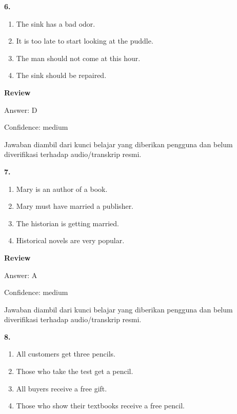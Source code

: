\documentclass[12pt]{article}
\begin{document}
\vspace{0.25\baselineskip}
\noindent\textbf{6.}
\begin{enumerate}[label=(\Alph*),leftmargin=*,itemsep=0.2em]
\item The sink has a bad odor.
\item It is too late to start looking at the puddle.
\item The man should not come at this hour.
\item The sink should be repaired.
\end{enumerate}
\par
\begingroup
\setlength{\parskip}{0pt}
\setlength{\parindent}{0pt}
\textbf{Review}\par
Answer: D\par
Confidence: medium\par
Jawaban diambil dari kunci belajar yang diberikan pengguna dan belum diverifikasi terhadap audio/transkrip resmi.\par
\endgroup
\par
\vspace{0.25\baselineskip}
\noindent\textbf{7.}
\begin{enumerate}[label=(\Alph*),leftmargin=*,itemsep=0.2em]
\item Mary is an author of a book.
\item Mary must have married a publisher.
\item The historian is getting married.
\item Historical novels are very popular.
\end{enumerate}
\par
\begingroup
\setlength{\parskip}{0pt}
\setlength{\parindent}{0pt}
\textbf{Review}\par
Answer: A\par
Confidence: medium\par
Jawaban diambil dari kunci belajar yang diberikan pengguna dan belum diverifikasi terhadap audio/transkrip resmi.\par
\endgroup
\par
\vspace{0.25\baselineskip}
\noindent\textbf{8.}
\begin{enumerate}[label=(\Alph*),leftmargin=*,itemsep=0.2em]
\item All customers get three pencils.
\item Those who take the test get a pencil.
\item All buyers receive a free gift.
\item Those who show their textbooks receive a free pencil.
\end{enumerate}
\end{document}
